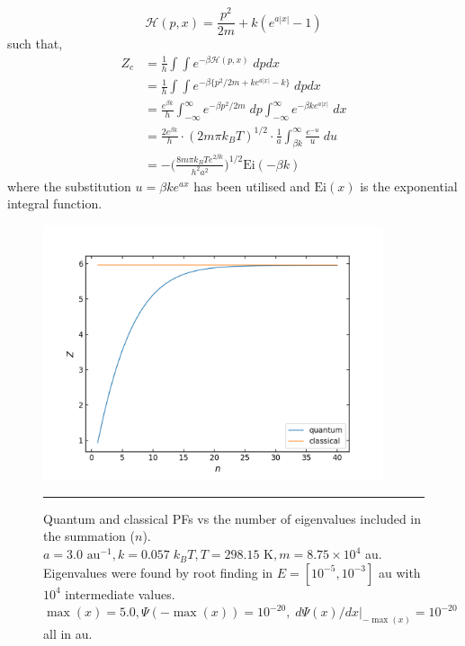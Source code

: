 \documentclass[../main.tex]{subfiles}
\begin{document}
\begin{equation}
\mathcal{H}(p, x) = \frac{p^2}{2m} + k (e^{a|x|} - 1)
\end{equation} 
such that,
\begin{equation}
\begin{aligned}
Z_c &= \frac{1}{h}\int\int e^{-\beta \mathcal{H}(p, x)} \; dp dx \\
&=  \frac{1}{h}\int\int e^{-\beta \{{p^2}/{2m} + k e^{a|x|} - k\}} \; dp dx \\
&=  \frac{e^{\beta k}}{h}\int_{-\infty}^\infty e^{-\beta {p^2}/{2m}} \;dp \int_{-\infty}^\infty e^{-\beta k e^{a|x|}} \;  dx \\
&=  \frac{2e^{\beta k}}{h} \cdot (2m\pi k_B T)^{1/2} \cdot \frac{1}{a} \int_{\beta k}^\infty \frac{e^{-u}}{u} \;  du \\
&=  -{\Big (} \frac{8m\pi k_B Te^{2\beta k}}{h^2a^2} {\Big )}^{1/2}  \text{Ei}(-\beta k)
\end{aligned}
\end{equation}
where the substitution $u = \beta k e^{ax}$ has been utilised and $\text{Ei}(x)$ is the exponential integral function.
\begin{figure}[h!]
	\centering
	\includegraphics[height=7.5cm]{4/figs/1d_exp_well_z_qunatum_classical}
	\vspace{0.2cm}
	\hrule
	\caption{Quantum and classical PFs vs the number of eigenvalues included in the summation ($n$). $a = 3.0 \text{ au}^{-1}, k = 0.057 \; k_B T, T = 298.15 \text{ K}, m =8.75 \times 10^4$ au. Eigenvalues were found by root finding in $E= [10^{-5}, 10^{-3}]$ au with $10^4$ intermediate values. $\max(x) = 5.0, \Psi(-\!\max(x)) = 10^{-20},\; d\Psi(x)/dx|_{-\!\max(x)} = 10^{-20}$ all in au.} 
	\label{1d_exp_well_z_qunatum_classical}
\end{figure}
\end{document}
